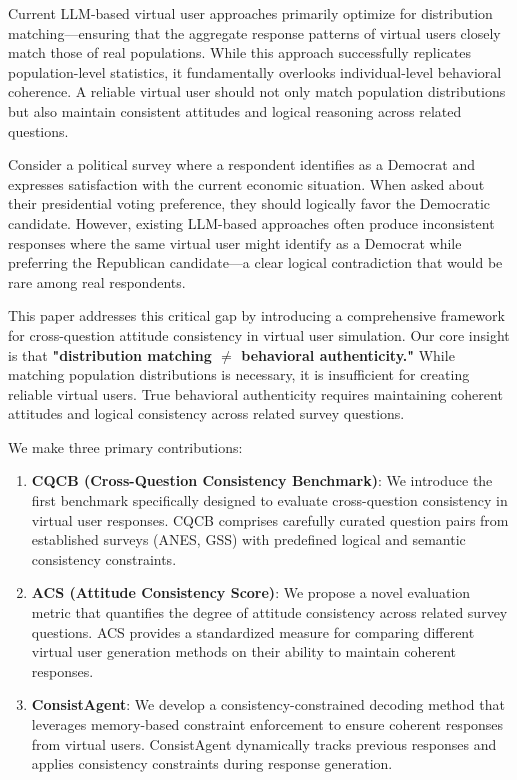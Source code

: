 \documentclass[sigconf, anonymous]{acmart}
\begin{document}
Current LLM-based virtual user approaches primarily optimize for distribution matching—ensuring that the aggregate response patterns of virtual users closely match those of real populations. While this approach successfully replicates population-level statistics, it fundamentally overlooks individual-level behavioral coherence. A reliable virtual user should not only match population distributions but also maintain consistent attitudes and logical reasoning across related questions.

Consider a political survey where a respondent identifies as a Democrat and expresses satisfaction with the current economic situation. When asked about their presidential voting preference, they should logically favor the Democratic candidate. However, existing LLM-based approaches often produce inconsistent responses where the same virtual user might identify as a Democrat while preferring the Republican candidate—a clear logical contradiction that would be rare among real respondents.

This paper addresses this critical gap by introducing a comprehensive framework for cross-question attitude consistency in virtual user simulation. Our core insight is that \textbf{"distribution matching $\neq$ behavioral authenticity."} While matching population distributions is necessary, it is insufficient for creating reliable virtual users. True behavioral authenticity requires maintaining coherent attitudes and logical consistency across related survey questions.

We make three primary contributions:

\begin{enumerate}
    \item \textbf{CQCB (Cross-Question Consistency Benchmark)}: We introduce the first benchmark specifically designed to evaluate cross-question consistency in virtual user responses. CQCB comprises carefully curated question pairs from established surveys (ANES, GSS) with predefined logical and semantic consistency constraints.
    
    \item \textbf{ACS (Attitude Consistency Score)}: We propose a novel evaluation metric that quantifies the degree of attitude consistency across related survey questions. ACS provides a standardized measure for comparing different virtual user generation methods on their ability to maintain coherent responses.
    
    \item \textbf{ConsistAgent}: We develop a consistency-constrained decoding method that leverages memory-based constraint enforcement to ensure coherent responses from virtual users. ConsistAgent dynamically tracks previous responses and applies consistency constraints during response generation.
\end{enumerate}
\end{document}
